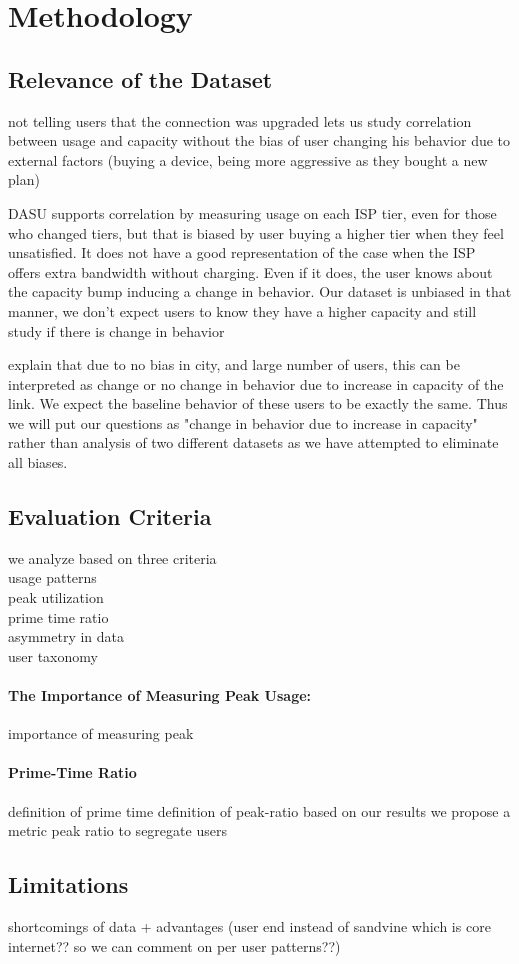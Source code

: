 \section{Methodology}
\label{sec:methodology}

\subsection{Relevance of the Dataset}

not telling users that the connection was upgraded lets us study correlation between usage and capacity without the bias of user changing his behavior due to external factors (buying a device, being more aggressive as they bought a new plan)


DASU supports correlation by measuring usage on each ISP tier, even for those who changed tiers, but that is biased by user buying a higher tier when they feel unsatisfied. It does not have a good representation of the case when the ISP offers extra bandwidth without charging. Even if it does, the user knows about the capacity bump inducing a change in behavior. Our dataset is unbiased in that manner, we don't expect users to know they have a higher capacity and still study if there is change in behavior


 explain that due to no bias in city, and large number of users, this can be interpreted as change or no change in behavior due to increase in capacity of the link. We expect the baseline behavior of these users to be exactly the same. Thus we will put our questions as "change in behavior due to increase in capacity" rather than analysis of two different datasets as we have attempted to eliminate all biases.

\subsection{Evaluation Criteria}
we analyze based on three criteria\\
usage patterns\\
peak utilization\\
prime time ratio\\
asymmetry in data\\
user taxonomy


\paragraph{The Importance of Measuring Peak Usage:}
 importance of measuring peak

\paragraph{Prime-Time Ratio} definition of prime time
definition of peak-ratio
based on our results we propose a metric peak ratio to segregate users

\subsection{Limitations}
 
 shortcomings of data + advantages (user end instead of sandvine which is core internet?? so we can comment on per user patterns??)